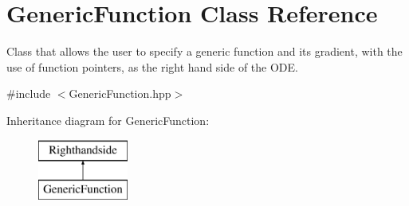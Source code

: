 \hypertarget{class_generic_function}{}\section{Generic\+Function Class Reference}
\label{class_generic_function}


Class that allows the user to specify a generic function and its gradient, with the use of function pointers, as the right hand side of the O\+D\+E.  




{\ttfamily \#include $<$Generic\+Function.\+hpp$>$}

Inheritance diagram for Generic\+Function\+:\begin{figure}[H]
\begin{center}
\leavevmode
\includegraphics[height=2.000000cm]{class_generic_function}
\end{center}
\end{figure}
